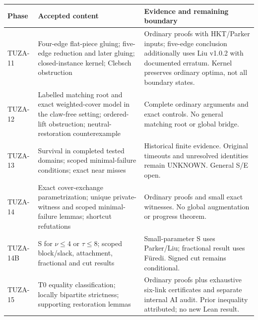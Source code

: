 \documentclass[11pt,a4paper]{article}
\begin{document}
{\def\LTcaptype{none} %
\begin{longtable}[]{@{}
  >{\raggedright\arraybackslash}p{}
  >{\raggedright\arraybackslash}p{}
  >{\raggedright\arraybackslash}p{}@{}}
\toprule\noalign{}
\begin{minipage}[b]{\linewidth}\raggedright
Phase
\end{minipage} & \begin{minipage}[b]{\linewidth}\raggedright
Accepted content
\end{minipage} & \begin{minipage}[b]{\linewidth}\raggedright
Evidence and remaining boundary
\end{minipage} \\
\midrule\noalign{}
\endhead
\bottomrule\noalign{}
\endlastfoot
TUZA-11 & Four-edge flat-piece gluing; five-edge reduction and later gluing; closed-instance kernel; Clebsch obstruction & Ordinary proofs with HKT/Parker inputs; five-edge conclusion additionally uses Liu v1.0.2 with documented erratum. Kernel preserves ordinary optima, not all boundary states. \\
TUZA-12 & Labelled matching root and exact weighted-cover model in the claw-free setting; ordered-lift obstruction; neutral-restoration counterexample & Complete ordinary arguments and exact controls. No general matching root or global bridge. \\
TUZA-13 & Survival in completed tested domains; scoped minimal-failure conditions; exact near misses & Historical finite evidence. Original timeouts and unresolved identities remain UNKNOWN. General S/E open. \\
TUZA-14 & Exact cover-exchange parametrization; unique private-witness and scoped minimal-failure lemmas; shortcut refutations & Ordinary proofs and small exact witnesses. No global augmentation or progress theorem. \\
TUZA-14B & S for \(\nu\le4\) or \(\tau\le8\); scoped block/slack, attachment, fractional and cut results & Small-parameter S uses Parker/Liu; fractional result uses Füredi. Signed cut remains conditional. \\
TUZA-15 & T0 equality classification; locally bipartite strictness; supporting restoration lemmas & Ordinary proofs plus exhaustive six-link certificates and separate internal AI audit. Prior inequality attributed; no new Lean result. \\
\end{longtable}
}
\end{document}
